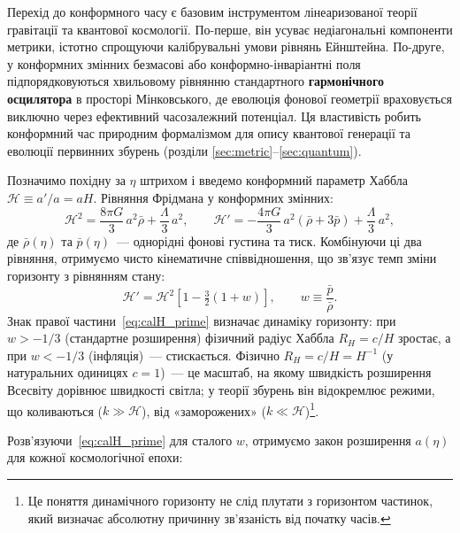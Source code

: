 \documentclass[12pt, a4paper]{article}
\begin{document}
\begin{keybox}
Перехід до конформного часу є базовим інструментом лінеаризованої теорії
гравітації та квантової космології. По-перше, він усуває недіагональні
компоненти метрики, істотно спрощуючи калібрувальні умови рівнянь Ейнштейна.
По-друге, у конформних змінних безмасові або конформно-інваріантні поля
підпорядковуються хвильовому рівнянню стандартного \textbf{гармонічного осцилятора}
в просторі Мінковського, де еволюція фонової геометрії враховується виключно
через ефективний часозалежний потенціал. Ця властивість робить конформний
час природним формалізмом для опису квантової генерації та еволюції
первинних збурень (розділи \ref{sec:metric}–\ref{sec:quantum}).
\end{keybox}

Позначимо похідну за $\eta$ штрихом і введемо конформний
параметр Хаббла $\mathcal{H} \equiv a'/a = aH$. Рівняння
Фрідмана у конформних змінних:
\begin{equation*}
  \mathcal{H}^2 = \frac{8\pi G}{3}\,a^2\bar{\rho}
                + \frac{\Lambda}{3}\,a^2,
  \qquad
  \mathcal{H}' = -\frac{4\pi G}{3}\,a^2(\bar{\rho} + 3\bar{p})
               + \frac{\Lambda}{3}\,a^2,
\end{equation*}
де $\bar{\rho}(\eta)$ та $\bar{p}(\eta)$~--- однорідні фонові
густина та тиск. Комбінуючи ці два рівняння, отримуємо чисто
кінематичне співвідношення, що зв'язує темп зміни горизонту
з рівнянням стану:
\begin{equation}\label{eq:calH_prime}
  \mathcal{H}' = \mathcal{H}^2\!\left[1 - \tfrac{3}{2}(1+w)\right],
  \qquad w \equiv \frac{\bar{p}}{\bar{\rho}}.
\end{equation}
Знак правої частини~\eqref{eq:calH_prime} визначає динаміку
горизонту: при $w > -1/3$ (стандартне розширення) фізичний
радіус Хаббла $R_H = c/H$ зростає, а при $w < -1/3$
(інфляція)~--- стискається. Фізично $R_H = c/H = H^{-1}$ (у натуральних одиницях $c=1$)~--- це масштаб,
на якому швидкість розширення Всесвіту дорівнює швидкості
світла; у теорії збурень він відокремлює режими, що
коливаються ($k \gg \mathcal{H}$), від «заморожених»
($k \ll \mathcal{H}$)\footnote{Це поняття динамічного
горизонту не слід плутати з горизонтом частинок, який
визначає абсолютну причинну зв'язаність від початку часів.}.

Розв'язуючи~\eqref{eq:calH_prime} для сталого $w$, отримуємо
закон розширення $a(\eta)$ для кожної космологічної епохи:
\end{document}
